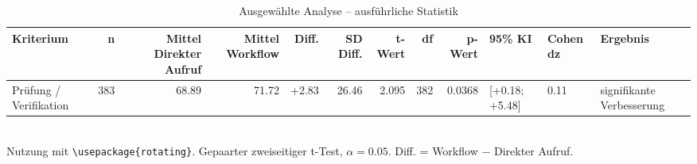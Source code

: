 \begin{table}
\centering
\caption{Ausgewählte Analyse -- ausführliche Statistik}
\begin{tabular}{lrrrrrrrrlll}
\toprule
Kriterium & n & Mittel Direkter Aufruf & Mittel Workflow & Diff. & SD Diff. & t-Wert & df & p-Wert & 95\% KI & Cohen dz & Ergebnis \\
\midrule
Prüfung / Verifikation & 383 & 68.89 & 71.72 & +2.83 & 26.46 & 2.095 & 382 & 0.0368 & [+0.18; +5.48] & 0.11 & signifikante Verbesserung \\
\bottomrule
\end{tabular}
\\[2mm]
\footnotesize Nutzung mit \texttt{\textbackslash usepackage\{rotating\}}. Gepaarter zweiseitiger t-Test, $\alpha=0.05$. Diff. = Workflow $-$ Direkter Aufruf.
\end{table}
